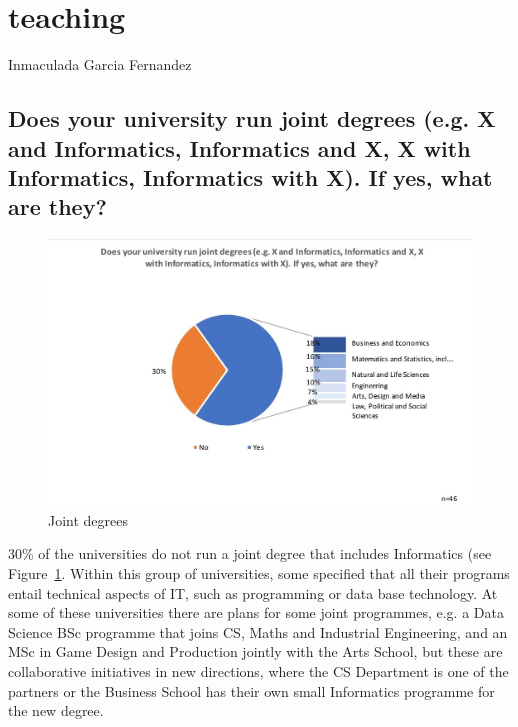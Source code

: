 \pagebreak
\section{teaching}

Inmaculada Garcia Fernandez
\subsection { Does your university run joint degrees (e.g. X and Informatics, Informatics and X, X with Informatics, Informatics with X). If yes, what are they?}

\begin{figure}[h]
\includegraphics[width = \linewidth]{charts/2a.jpg}
\caption{Joint degrees}
\label{sect3:joint}
\end{figure}

30\% of the universities do not run a joint degree that includes Informatics (see Figure~\ref{sect3:joint}. Within this group of universities, some specified that all their programs entail technical aspects of IT, such as programming or data base technology.  At some of these universities there are plans for some joint programmes, e.g. a Data Science BSc programme that joins CS, Maths and Industrial Engineering, and an MSc in Game Design and Production jointly with the Arts School, but these are collaborative initiatives in new directions, where the CS Department is one of the partners or the Business School has their own small Informatics programme for the new degree.

